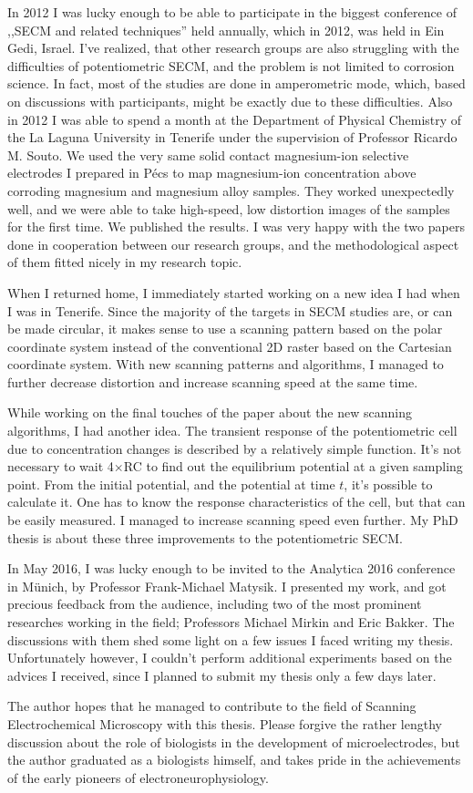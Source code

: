 In 2012 I was lucky enough to be able to participate in the biggest conference of ,,SECM and related techniques'' held annually, which in 2012, was held in Ein Gedi, Israel.
I've realized, that other research groups are also struggling with the difficulties of potentiometric SECM, and the problem is not limited to corrosion science.
In fact, most of the studies are done in amperometric mode, which, based on discussions with participants, might be exactly due to these difficulties.
Also in 2012 I was able to spend a month at the Department of Physical Chemistry of the La Laguna University in Tenerife under the supervision of Professor Ricardo M. Souto.
We used the very same solid contact magnesium-ion selective electrodes I prepared in Pécs to map magnesium-ion concentration above corroding magnesium and magnesium alloy samples.
They worked unexpectedly well, and we were able to take high-speed, low distortion images of the samples for the first time.
We published the results.
I was very happy with the two papers done in cooperation between our research groups, and the methodological aspect of them fitted nicely in my research topic.

When I returned home, I immediately started working on a new idea I had when I was in Tenerife.
Since the majority of the targets in SECM studies are, or can be made circular, it makes sense to use a scanning pattern based on the polar coordinate system instead of the conventional 2D raster based on the Cartesian coordinate system.
With new scanning patterns and algorithms, I managed to further decrease distortion and increase scanning speed at the same time.

While working on the final touches of the paper about the new scanning algorithms, I had another idea.
The transient response of the potentiometric cell due to concentration changes is described by a relatively simple function.
It's not necessary to wait 4$\times$RC to find out the equilibrium potential at a given sampling point.
From the initial potential, and the potential at time $t$, it's possible to calculate it.
One has to know the response characteristics of the cell, but that can be easily measured.
I managed to increase scanning speed even further.
My PhD thesis is about these three improvements to the potentiometric SECM.

In May 2016, I was lucky enough to be invited to the Analytica 2016 conference in Münich, by Professor Frank-Michael Matysik.
I presented my work, and got precious feedback from the audience, including two of the most prominent researches working in the field; Professors Michael Mirkin and Eric Bakker.
The discussions with them shed some light on a few issues I faced writing my thesis.
Unfortunately however, I couldn't perform additional experiments based on the advices I received, since I planned to submit my thesis only a few days later.

The author hopes that he managed to contribute to the field of Scanning Electrochemical Microscopy with this thesis.
Please forgive the rather lengthy discussion about the role of biologists in the development of microelectrodes, but the author graduated as a biologists himself, and takes pride in the achievements of the early pioneers of electroneurophysiology.
